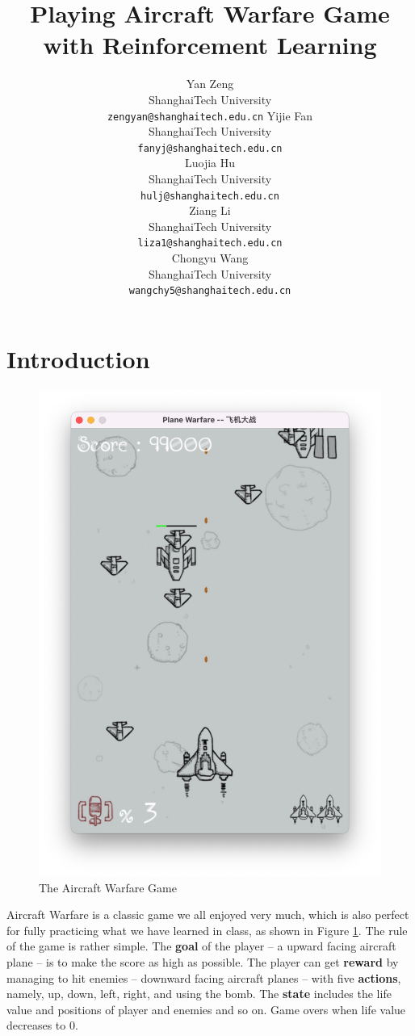 \documentclass{article}
\title{Playing Aircraft Warfare Game with Reinforcement Learning}
\author{
    Yan Zeng\\
    ShanghaiTech University\\
    \texttt{zengyan@shanghaitech.edu.cn} 
    \AND
    Yijie Fan\\
    ShanghaiTech University\\
    \texttt{fanyj@shanghaitech.edu.cn}\\
    \AND
    Luojia Hu\\
    ShanghaiTech University\\
    \texttt{hulj@shanghaitech.edu.cn}\\
    \AND
    Ziang Li\\
    ShanghaiTech University\\
    \texttt{liza1@shanghaitech.edu.cn}\\
    \AND
    Chongyu Wang\\
    ShanghaiTech University\\
    \texttt{wangchy5@shanghaitech.edu.cn}\\    
}
\begin{document}
\maketitle



\section{Introduction}
\begin{figure}
    \centering
    \includegraphics[width=\linewidth]{pictures/game.jpg}
    \caption{The Aircraft Warfare Game}
    \label{fig:aircraft_warfare_game}
\end{figure}

\par Aircraft Warfare is a classic game we all enjoyed very much, which is also perfect for fully practicing what we have learned in class, as shown in Figure \ref{fig:aircraft_warfare_game}. The rule of the game is rather simple. The \textbf{goal} of the player -- a upward facing aircraft plane -- is to make the score as high as possible. The player can get \textbf{reward} by managing to hit enemies -- downward facing aircraft planes -- with five \textbf{actions}, namely, up, down, left, right, and using the bomb.  The \textbf{state} includes the life value and positions of player and enemies and so on. Game overs when life value decreases to 0.
\end{document}
